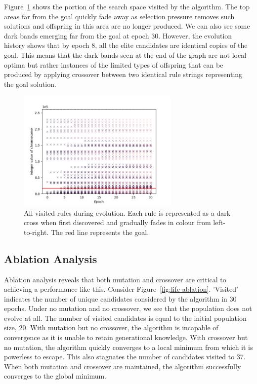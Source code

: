 Figure~\ref{fig:life-searchgraph} shows the portion of the search space visited by the algorithm. The top areas far from the goal quickly fade away as selection pressure removes such solutions and offspring in this area are no longer produced. We can also see some dark bands emerging far from the goal at epoch 30. However, the evolution history shows that by epoch 8, all the elite candidates are identical copies of the goal. This means that the dark bands seen at the end of the graph are not local optima but rather instances of the limited types of offspring that can be produced by applying crossover between two identical rule strings representing the goal solution.

\begin{figure}[!h]
\centering
\includegraphics[width=0.7\textwidth]{images/life_like_eval/life-searchgraph.png}
\caption{All visited rules during evolution. Each rule is represented as a dark cross when first discovered and gradually fades in colour from left-to-right. The red line represents the goal.}
\label{fig:life-searchgraph}
\end{figure}

\subsection{Ablation Analysis}
Ablation analysis reveals that both mutation and crossover are critical to achieving a performance like this. Consider Figure~\ref{fig:life-ablation}. 'Visited' indicates the number of unique candidates considered by the algorithm in 30 epochs. Under no mutation and no crossover, we see that the population does not evolve at all. The number of visited candidates is equal to the initial population size, 20. With mutation but no crossover, the algorithm is incapable of convergence as it is unable to retain generational knowledge. With crossover but no mutation, the algorithm quickly converges to a local minimum from which it is powerless to escape. This also stagnates the number of candidates visited to 37. When both mutation and crossover are maintained, the algorithm successfully converges to the global minimum.\\ 

